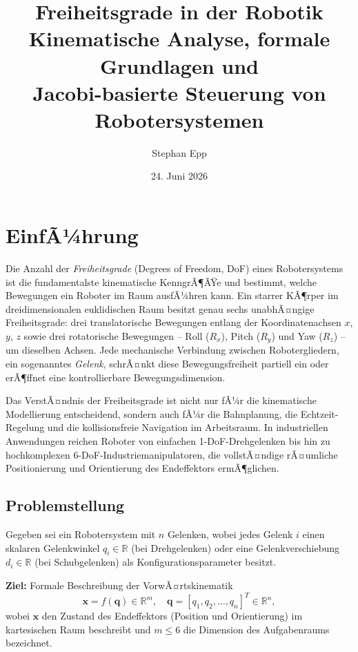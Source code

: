﻿\documentclass[a4paper,12pt]{article}
\title{\textbf{Freiheitsgrade in der Robotik}\\
\large Kinematische Analyse, formale Grundlagen und \\
Jacobi-basierte Steuerung von Robotersystemen}
\author{Stephan Epp}
\date{24. Juni 2026}
\theoremstyle{definition}
\begin{document}
\maketitle
\tableofcontents
\newpage

\section{EinfÃ¼hrung}

Die Anzahl der \emph{Freiheitsgrade} (Degrees of Freedom, DoF) eines Robotersystems ist die fundamentalste kinematische KenngrÃ¶ÃŸe und bestimmt, welche Bewegungen ein Roboter im Raum ausfÃ¼hren kann. Ein starrer KÃ¶rper im dreidimensionalen euklidischen Raum besitzt genau sechs unabhÃ¤ngige Freiheitsgrade: drei translatorische Bewegungen entlang der Koordinatenachsen $x$, $y$, $z$ sowie drei rotatorische Bewegungen -- Roll ($R_x$), Pitch ($R_y$) und Yaw ($R_z$) -- um dieselben Achsen. Jede mechanische Verbindung zwischen Robotergliedern, ein sogenanntes \emph{Gelenk}, schrÃ¤nkt diese Bewegungsfreiheit partiell ein oder erÃ¶ffnet eine kontrollierbare Bewegungsdimension.

Das VerstÃ¤ndnis der Freiheitsgrade ist nicht nur fÃ¼r die kinematische Modellierung entscheidend, sondern auch fÃ¼r die Bahnplanung, die Echtzeit-Regelung und die kollisionsfreie Navigation im Arbeitsraum. In industriellen Anwendungen reichen Roboter von einfachen 1-DoF-Drehgelenken bis hin zu hochkomplexen 6-DoF-Industriemanipulatoren, die vollstÃ¤ndige rÃ¤umliche Positionierung und Orientierung des Endeffektors ermÃ¶glichen.

\subsection{Problemstellung}

Gegeben sei ein Robotersystem mit $n$ Gelenken, wobei jedes Gelenk $i$ einen skalaren Gelenkwinkel $q_i \in \mathbb{R}$ (bei Drehgelenken) oder eine Gelenkverschiebung $d_i \in \mathbb{R}$ (bei Schubgelenken) als Konfigurationsparameter besitzt.

\textbf{Ziel:} Formale Beschreibung der VorwÃ¤rtskinematik
\[
	\mathbf{x} = f(\mathbf{q}) \in \mathbb{R}^m,
	\quad
	\mathbf{q} = [q_1, q_2, \ldots, q_n]^T \in \mathbb{R}^n,
\]
wobei $\mathbf{x}$ den Zustand des Endeffektors (Position und Orientierung) im kartesischen Raum beschreibt und $m \leq 6$ die Dimension des Aufgabenraums bezeichnet.
\end{document}
